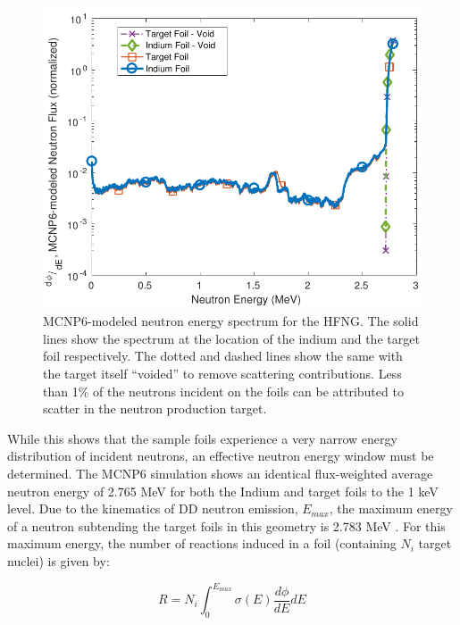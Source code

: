 \documentclass[5p]{elsarticle}
\newcommand{\comment}[1]{\todo[color=blue!20!white,inline]{ASV: #1}}
\begin{document}
\begin{figure}
 \centering
 \includegraphics[scale=0.6]{./figures/mcnp_flux_new.pdf}
 \caption{MCNP6-modeled neutron energy spectrum for the HFNG.  The solid lines show the spectrum at the location of the indium and the target foil respectively. The dotted and dashed lines show the same with the target itself \enquote{voided} to remove scattering contributions.  Less than 1\%  of the neutrons incident on the foils can be attributed to scatter in the neutron production target.}
 \label{fig:mcnp_flux}
\end{figure}





While this shows that the sample foils experience a very narrow energy distribution of incident neutrons, an effective neutron energy window must be determined.
The MCNP6 simulation shows an identical flux-weighted average neutron energy of 2.765 MeV for both the Indium and target foils to the 1 keV level.
Due to the kinematics of DD neutron emission, $E_{max}$,  the maximum energy of a neutron subtending the target foils in this geometry is 2.783 MeV \cite{Liskien_Paulsen_1973}.
For this maximum energy, the number of reactions induced in a foil (containing $N_i$ target nuclei) is given by:

\begin{equation}
R = N_i \int_0^{E_{max}} \sigma(E) \dfrac{d\phi}{dE} dE
\end{equation}
\end{document}
